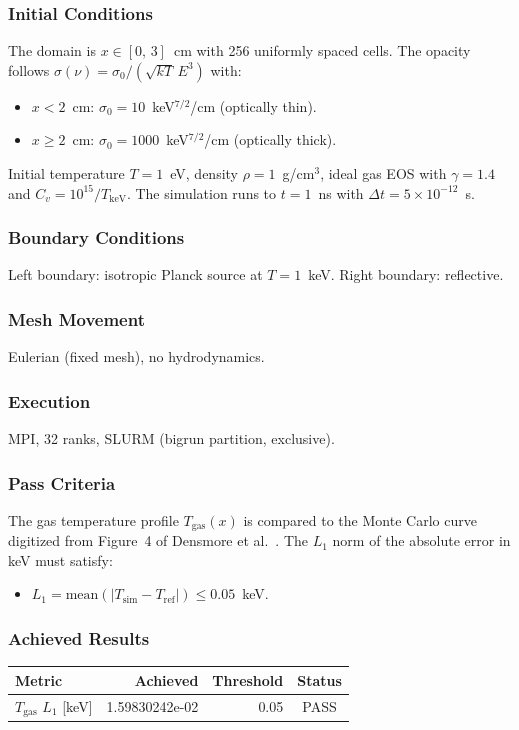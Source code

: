 \documentclass[11pt,a4paper]{article}
\begin{document}
\subsubsection*{Initial Conditions}
The domain is $x \in [0,\,3]$~cm with 256 uniformly spaced cells. The opacity follows $\sigma(\nu) = \sigma_0 / (\sqrt{kT}\,E^3)$ with:
\begin{itemize}
  \item $x < 2$~cm: $\sigma_0 = 10$~keV$^{7/2}$/cm (optically thin).
  \item $x \ge 2$~cm: $\sigma_0 = 1000$~keV$^{7/2}$/cm (optically thick).
\end{itemize}
Initial temperature $T = 1$~eV, density $\rho = 1$~g/cm$^3$, ideal gas EOS with $\gamma = 1.4$ and $C_v = 10^{15}/T_{\mathrm{keV}}$. The simulation runs to $t = 1$~ns with $\Delta t = 5 \times 10^{-12}$~s.

\subsubsection*{Boundary Conditions}
Left boundary: isotropic Planck source at $T = 1$~keV. Right boundary: reflective.

\subsubsection*{Mesh Movement}
Eulerian (fixed mesh), no hydrodynamics.

\subsubsection*{Execution}
MPI, 32 ranks, SLURM (bigrun partition, exclusive).

\subsubsection*{Pass Criteria}
The gas temperature profile $T_{\mathrm{gas}}(x)$ is compared to the Monte Carlo curve digitized from Figure~4 of Densmore et al.\ \cite{densmore2012}. The $L_1$ norm of the absolute error in keV must satisfy:
\begin{itemize}
  \item $L_1 = \mathrm{mean}(|T_{\mathrm{sim}} - T_{\mathrm{ref}}|) \le 0.05$~keV.
\end{itemize}

\subsubsection*{Achieved Results}
\begin{table}[htbp]
\centering
\begin{tabular}{l r r c}
\toprule
\textbf{Metric} & \textbf{Achieved} & \textbf{Threshold} & \textbf{Status} \\
\midrule
$T_{\mathrm{gas}}$ $L_1$ [keV] & 1.59830242e-02 & 0.05 & {\color{green!60!black}PASS} \\
\bottomrule
\end{tabular}
\end{table}
\end{document}
